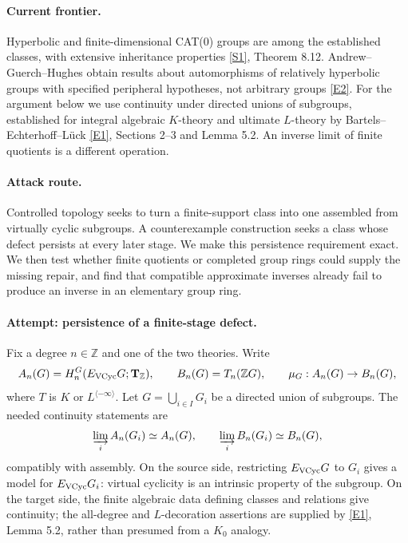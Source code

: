\documentclass[11pt,a4paper]{article}
\newcommand{\Z}{\mathbb{Z}}
\newcommand{\sref}[2]{\hyperlink{source:#1:#2}{[S#2]}}
\newcommand{\eref}[2]{\hyperlink{extra:#1:#2}{[E#2]}}
\numberwithin{equation}{section}
\begin{document}
\paragraph{Current frontier.}
Hyperbolic and finite-dimensional CAT(0) groups are among the established classes, with extensive inheritance properties \sref{1452}{1}, Theorem 8.12. Andrew--Guerch--Hughes obtain results about automorphisms of relatively hyperbolic groups with specified peripheral hypotheses, not arbitrary groups \eref{1452}{2}. For the argument below we use continuity under directed unions of subgroups, established for integral algebraic $K$-theory and ultimate $L$-theory by Bartels--Echterhoff--Lück \eref{1452}{1}, Sections 2--3 and Lemma 5.2. An inverse limit of finite quotients is a different operation.

\paragraph{Attack route.}
Controlled topology seeks to turn a finite-support class into one assembled from virtually cyclic subgroups. A counterexample construction seeks a class whose defect persists at every later stage. We make this persistence requirement exact. We then test whether finite quotients or completed group rings could supply the missing repair, and find that compatible approximate inverses already fail to produce an inverse in an elementary group ring.

\paragraph{Attempt: persistence of a finite-stage defect.}
Fix a degree $n\in\Z$ and one of the two theories. Write
\[
 A_n(G)=H_n^G(E_{\rm VCyc}G;\mathbf T_{\Z}),\qquad
 B_n(G)=T_n(\Z G),\qquad \mu_G:A_n(G)\to B_n(G),
\]
where $T$ is $K$ or $L^{\langle-\infty\rangle}$. Let $G=\bigcup_{i\in I}G_i$ be a directed union of subgroups. The needed continuity statements are
\begin{equation}\label{r68:colimit}
 \varinjlim_i A_n(G_i)\simeq A_n(G),\qquad
 \varinjlim_i B_n(G_i)\simeq B_n(G),
\end{equation}
compatibly with assembly. On the source side, restricting $E_{\rm VCyc}G$ to $G_i$ gives a model for $E_{\rm VCyc}G_i$: virtual cyclicity is an intrinsic property of the subgroup. On the target side, the finite algebraic data defining classes and relations give continuity; the all-degree and $L$-decoration assertions are supplied by \eref{1452}{1}, Lemma 5.2, rather than presumed from a $K_0$ analogy.
\end{document}
